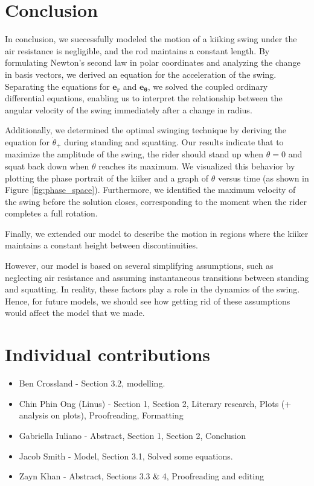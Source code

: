 \documentclass[12pt]{article}
\begin{document}
\section{Conclusion}
In conclusion, we successfully modeled the motion of a kiiking swing under the air resistance is negligible, and the rod maintains a constant length. By formulating Newton’s second law in polar coordinates and analyzing the change in basis vectors, we derived an equation for the acceleration of the swing. Separating the equations for \(\mathbf{e_r}\) and \(\mathbf{e_{\theta}}\), we solved the coupled ordinary differential equations, enabling us to interpret the relationship between the angular velocity of the swing immediately after a change in radius.  

Additionally, we determined the optimal swinging technique by deriving the equation for \(\dot{\theta}_{+}\) during standing and squatting. Our results indicate that to maximize the amplitude of the swing, the rider should stand up when \(\theta = 0\) and squat back down when \(\theta\) reaches its maximum. We visualized this behavior by plotting the phase portrait of the kiiker and a graph of \(\theta\) versus time (as shown in Figure \ref{fig:phase_space}). Furthermore, we identified the maximum velocity of the swing before the solution closes, corresponding to the moment when the rider completes a full rotation.  

Finally, we extended our model to describe the motion in regions where the kiiker maintains a constant height between discontinuities.  

However, our model is based on several simplifying assumptions, such as neglecting air resistance and assuming instantaneous transitions between standing and squatting. In reality, these factors play a role in the dynamics of the swing.  Hence, for future models, we should see how getting rid of these assumptions would affect the model that we made.



\section{Individual contributions}
\begin{itemize}
    \item Ben Crossland - Section 3.2, modelling.
    \item Chin Phin Ong (Linus) - Section 1, Section 2, Literary research, Plots (+ analysis on plots), Proofreading, Formatting
    \item Gabriella Iuliano - Abstract, Section 1,  Section 2, Conclusion
    \item Jacob Smith - Model, Section 3.1, Solved some equations.
    \item Zayn Khan - Abstract, Sections 3.3$\And$4, Proofreading and editing
\end{itemize}
\end{document}

